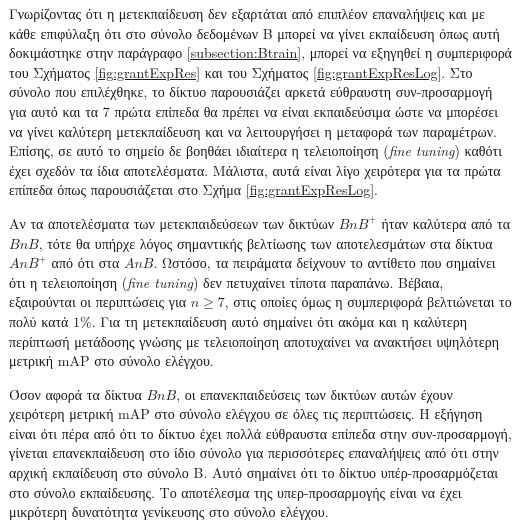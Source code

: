 Γνωρίζοντας ότι η μετεκπαίδευση δεν εξαρτάται από επιπλέον επαναλήψεις και με κάθε επιφύλαξη ότι στο σύνολο δεδομένων B μπορεί να γίνει εκπαίδευση όπως αυτή δοκιμάστηκε στην παράγραφο \ref{subsection:Btrain}, μπορεί να εξηγηθεί η συμπεριφορά του Σχήματος \ref{fig:grantExpRes} και του Σχήματος \ref{fig:grantExpResLog}. Στο σύνολο που επιλέχθηκε, το δίκτυο παρουσιάζει αρκετά εύθραυστη συν-προσαρμογή για αυτό και τα $7$ πρώτα επίπεδα θα πρέπει να είναι εκπαιδεύσιμα ώστε να μπορέσει να γίνει καλύτερη μετεκπαίδευση και να λειτουργήσει η μεταφορά των παραμέτρων. Επίσης, σε αυτό το σημείο δε βοηθάει ιδιαίτερα η τελειοποίηση (\textit{fine tuning}) καθότι έχει σχεδόν τα ίδια αποτελέσματα. Μάλιστα, αυτά είναι λίγο χειρότερα για τα πρώτα επίπεδα όπως παρουσιάζεται στο Σχήμα \ref{fig:grantExpResLog}. 

Αν τα αποτελέσματα των μετεκπαιδεύσεων των δικτύων $BnB^+$ ήταν καλύτερα από τα $BnB$, τότε θα υπήρχε λόγος σημαντικής βελτίωσης των αποτελεσμάτων στα δίκτυα $AnB^+$ από ότι στα $AnB$. Ωστόσο, τα πειράματα δείχνουν το αντίθετο που σημαίνει ότι η τελειοποίηση (\textit{fine tuning}) δεν πετυχαίνει τίποτα παραπάνω. Βέβαια, εξαιρούνται οι περιπτώσεις για $n \geq 7$, στις οποίες όμως η συμπεριφορά βελτιώνεται το πολύ κατά $1\%$. Για τη μετεκπαίδευση αυτό σημαίνει ότι ακόμα και η καλύτερη περίπτωσή μετάδοσης γνώσης με τελειοποίηση αποτυχαίνει να ανακτήσει υψηλότερη μετρική mAP στο σύνολο ελέγχου.

Όσον αφορά τα δίκτυα $BnB$, οι επανεκπαιδεύσεις των δικτύων αυτών έχουν χειρότερη μετρική mAP στο σύνολο ελέγχου σε όλες τις περιπτώσεις. Η εξήγηση είναι ότι πέρα από ότι το δίκτυο έχει πολλά εύθραυστα επίπεδα στην συν-προσαρμογή, γίνεται επανεκπαίδευση στο ίδιο σύνολο για περισσότερες επαναλήψεις από ότι στην αρχική εκπαίδευση στο σύνολο B. Αυτό σημαίνει ότι το δίκτυο υπέρ-προσαρμόζεται στο σύνολο εκπαίδευσης. Το αποτέλεσμα της υπερ-προσαρμογής είναι να έχει μικρότερη δυνατότητα γενίκευσης στο σύνολο ελέγχου.

